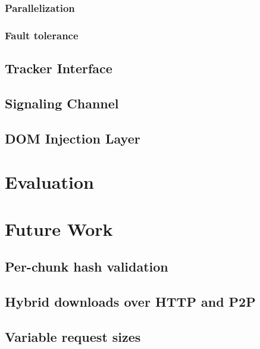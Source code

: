 \documentclass[letterpaper,twocolumn,10pt]{article}
\begin{document}

\subsubsection{Parallelization}


\subsubsection{Fault tolerance}


\subsection{Tracker Interface}


\subsection{Signaling Channel}


\subsection{DOM Injection Layer}


\section{Evaluation}


\section{Future Work}

\subsection{Per-chunk hash validation}


\subsection{Hybrid downloads over HTTP and P2P}


\subsection{Variable request sizes}
\end{document}
